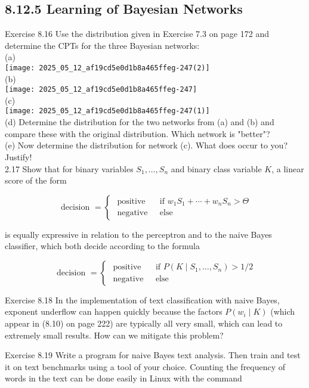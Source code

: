 \documentclass[10pt]{article}
\begin{document}
\subsection*{8.12.5 Learning of Bayesian Networks}
Exercise 8.16 Use the distribution given in Exercise 7.3 on page 172 and determine the CPTs for the three Bayesian networks:\\
(a)\\
\texttt{[image: 2025\_05\_12\_af19cd5e0d1b8a465ffeg-247(2)]}\\
(b)\\
\texttt{[image: 2025\_05\_12\_af19cd5e0d1b8a465ffeg-247]}\\
(c)\\
\texttt{[image: 2025\_05\_12\_af19cd5e0d1b8a465ffeg-247(1)]}\\
(d) Determine the distribution for the two networks from (a) and (b) and compare these with the original distribution. Which network is "better"?\\
(e) Now determine the distribution for network (c). What does occur to you? Justify!\\
2.17 Show that for binary variables $S_{1}, \ldots, S_{n}$ and binary class variable $K$, a linear score of the form

$$
\text { decision }= \begin{cases}\text { positive } & \text { if } w_{1} S_{1}+\cdots+w_{n} S_{n}>\Theta \\ \text { negative } & \text { else }\end{cases}
$$

is equally expressive in relation to the perceptron and to the naive Bayes classifier, which both decide according to the formula

$$
\text { decision }= \begin{cases}\text { positive } & \text { if } P\left(K \mid S_{1}, \ldots, S_{n}\right)>1 / 2 \\ \text { negative } & \text { else }\end{cases}
$$

Exercise 8.18 In the implementation of text classification with naive Bayes, exponent underflow can happen quickly because the factors $P\left(w_{i} \mid K\right)$ (which appear in (8.10) on page 222) are typically all very small, which can lead to extremely small results. How can we mitigate this problem?

Exercise 8.19 Write a program for naive Bayes text analysis. Then train and test it on text benchmarks using a tool of your choice. Counting the frequency of words in the text can be done easily in Linux with the command
\end{document}
